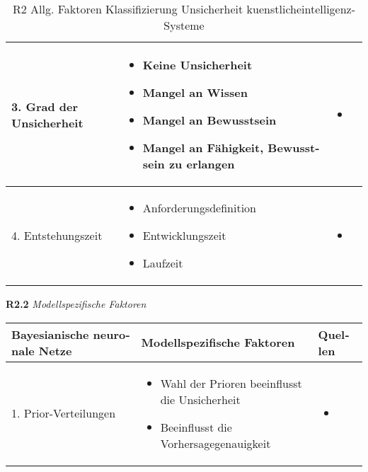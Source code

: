 \begin{otherlanguage}{ngerman}
\begin{table}[!htpb]
\begin{tabularx}{\textwidth}{|l|X|X|}
    \multirow{7}{*}{3. Grad der Unsicherheit} &
    \begin{itemize}[leftmargin=*, topsep=0em, itemsep=0em, label={}]
      \item Keine Unsicherheit
      \item Mangel an Wissen
      \item Mangel an Bewusstsein
      \item Mangel an Fähigkeit, Bewusstsein zu erlangen
    \end{itemize} &
    \begin{itemize}[leftmargin=*, topsep=0em, itemsep=0em, label={}]
      \item \parencite[S.~56–58]{AndreasKreutz2022}
    \end{itemize} \\ \hline

    \multirow{5}{*}{4. Entstehungszeit} &
    \begin{itemize}[leftmargin=*, topsep=0em, itemsep=0em, label={}]
      \item Anforderungsdefinition
      \item Entwicklungszeit
      \item Laufzeit
    \end{itemize} &
    \begin{itemize}[leftmargin=*, topsep=0em, itemsep=0em, label={}]
      \item \parencite[S.~60]{AndreasKreutz2022}
    \end{itemize} \\ \hline
  \end{tabularx}
  \caption{R2 Allg. Faktoren Klassifizierung Unsicherheit \gls{kuenstlicheintelligenz}-Systeme}
  \label{tab:chapter6r21}
\end{table}

\newpage

\textbf{R2.2} \textit{Modellspezifische Faktoren}

\begin{table}[!htpb]
  \centering
  \footnotesize
  \begin{tabularx}{\textwidth}{|l|X|X|}
    \hline
    \textbf{\gls{Bayesianische neuronale Netze}} & \hspace{0.6em}\textbf{Modellspezifische Faktoren} & \hspace{0.6em}\textbf{Quellen} \\ \hline

    \multirow{4}{*}{1. Prior-Verteilungen} &
    \begin{itemize}[leftmargin=*, topsep=0em, itemsep=0em, label={}]
      \item Wahl der Prioren beeinflusst die Unsicherheit
      \item Beeinflusst die Vorhersagegenauigkeit
    \end{itemize} &
    \begin{itemize}[leftmargin=*, topsep=0em, itemsep=0em, label={}]
      \item \parencite[Kap.~2.3]{gal2016uncertainty}
    \end{itemize} \\ \hline


\end{tabularx}
\end{table}
\end{otherlanguage}
